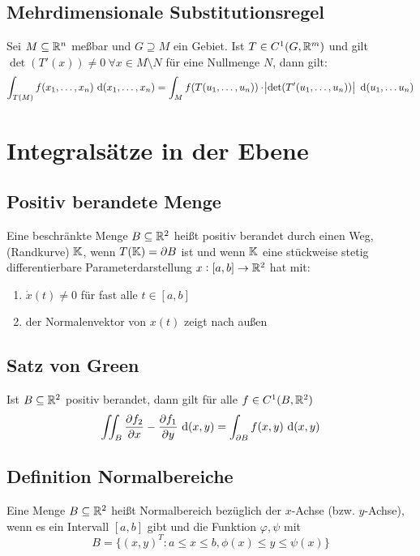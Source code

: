 \subsection{Mehrdimensionale Substitutionsregel}
Sei $M \subseteq \mathbb{R}^n$ meßbar und $G \supseteq M$ ein Gebiet. Ist $T\in C^1(G, \mathbb{R}^m)$
und gilt $\det(T'(x)) \neq 0\ \forall x \in M \setminus N$ für eine Nullmenge $N$,
dann gilt:
\begin{equation*}
    \int_{T(M)} f(x_1, \ldots, x_n) \text{ d}(x_1, \ldots, x_n) =
    \int_M f(T(u_1, \ldots, u_n)) \cdot \abs{\det(T'(u_1, \ldots, u_n))} \text{ d}(u_1, \ldots
    u_n)
\end{equation*}

\section{Integralsätze in der Ebene}
\subsection{Positiv berandete Menge}
Eine beschränkte Menge $B \subseteq \mathbb{R}^2$ heißt positiv berandet durch einen Weg,
(Randkurve) $\mathbb{K}$, wenn $T(\mathbb{K}) = \partial B$ ist und wenn $\mathbb{K}$ eine stückweise
stetig differentierbare Parameterdarstellung $x: [a,b] \to \mathbb{R}^2$ hat mit:
\begin{enumerate}[label = (\roman*)]
    \item $\dot{x}(t) \neq 0$ für fast alle $t \in [a,b]$
    \item der Normalenvektor von $x(t)$ zeigt nach außen
\end{enumerate}

\subsection{Satz von Green}
Ist $B \subseteq \mathbb{R}^2$ positiv berandet, dann gilt für alle $f \in C^1(B, \mathbb{R}^2)$
\begin{equation*}
    \iint_B \frac{\partial f_2}{\partial x} - \frac{\partial f_1}{\partial y}
    \text{ d}(x,y) =
    \int_{\partial B} f(x,y) \text{ d}(x,y)
\end{equation*}

\subsection{Definition Normalbereiche}
Eine Menge $B \subseteq \mathbb{R}^2$ heißt Normalbereich bezüglich der $x$-Achse
(bzw. $y$-Achse), wenn es ein Intervall $[a,b]$ gibt und die Funktion
$\varphi, \psi$ mit
\begin{equation*}
    B = \{ {(x,y)}^T: a \leq x \leq b, \phi(x) \leq y \leq \psi(x) \}
\end{equation*}

